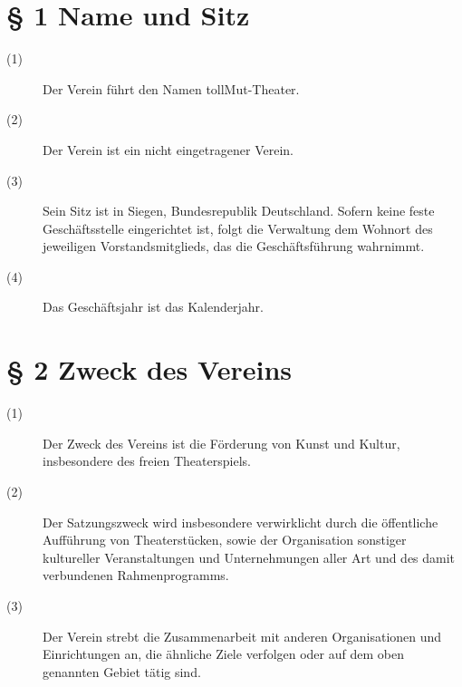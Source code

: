 \documentclass[a4paper,12pt]{scrartcl}
\begin{document}
\newpage

\tableofcontents
\thispagestyle{empty}
\clearpage



\renewcommand{\sectionmark}[1]{\markright{#1}}
\renewcommand{\subsectionmark}[1]{}
\renewcommand{\subsubsectionmark}[1]{}
\rhead{\today}

\onehalfspacing
\renewcommand{\thesection}{\arabic{section}}
\renewcommand{\thesection}{\arabic{section}}
\setcounter{section}{0}
\setcounter{page}{1}


\section*{\S{} 1 Name und Sitz}
\begin{description} 

\item[(1)] Der Verein führt den Namen \glqq tollMut-Theater\grqq . 
\item[(2)] Der Verein ist ein \glqq nicht eingetragener Verein\grqq .
\item[(3)] Sein Sitz ist in Siegen, Bundesrepublik Deutschland. Sofern keine feste Geschäftsstelle eingerichtet ist, folgt die Verwaltung dem Wohnort des jeweiligen Vorstandsmitglieds, das die Geschäftsführung wahrnimmt. 
\item[(4)] Das Geschäftsjahr ist das Kalenderjahr.

\end{description}



\section*{\S{} 2 Zweck des Vereins}
\begin{description} 

\item[(1)] Der Zweck des Vereins ist die Förderung von Kunst und Kultur, insbesondere des freien Theaterspiels.
\item[(2)] Der Satzungszweck wird insbesondere verwirklicht durch die öffentliche Aufführung von Theaterstücken, sowie der Organisation sonstiger kultureller Veranstaltungen und Unternehmungen aller Art und des damit verbundenen Rahmenprogramms.
\item[(3)] Der Verein strebt die Zusammenarbeit mit anderen Organisationen und Einrichtungen an, die ähnliche Ziele verfolgen oder auf dem oben genannten Gebiet tätig sind.
 
\end{description}
\end{document}
